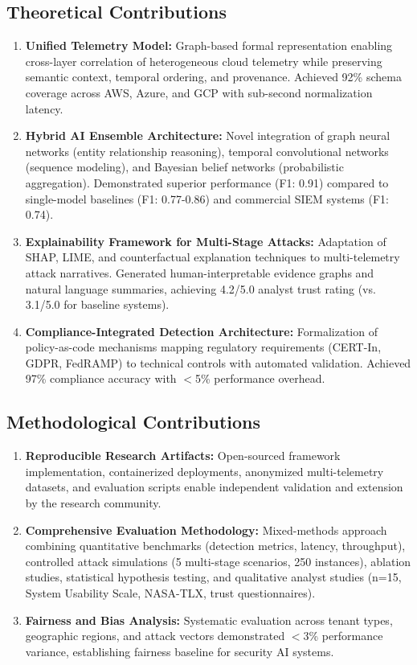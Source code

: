 \subsection{Theoretical Contributions}
\begin{enumerate}
    \item \textbf{Unified Telemetry Model:} Graph-based formal representation enabling cross-layer correlation of heterogeneous cloud telemetry while preserving semantic context, temporal ordering, and provenance. Achieved 92\% schema coverage across AWS, Azure, and GCP with sub-second normalization latency.
    
    \item \textbf{Hybrid AI Ensemble Architecture:} Novel integration of graph neural networks (entity relationship reasoning), temporal convolutional networks (sequence modeling), and Bayesian belief networks (probabilistic aggregation). Demonstrated superior performance (F1: 0.91) compared to single-model baselines (F1: 0.77-0.86) and commercial SIEM systems (F1: 0.74).
    
    \item \textbf{Explainability Framework for Multi-Stage Attacks:} Adaptation of SHAP, LIME, and counterfactual explanation techniques to multi-telemetry attack narratives. Generated human-interpretable evidence graphs and natural language summaries, achieving 4.2/5.0 analyst trust rating (vs. 3.1/5.0 for baseline systems).
    
    \item \textbf{Compliance-Integrated Detection Architecture:} Formalization of policy-as-code mechanisms mapping regulatory requirements (CERT-In, GDPR, FedRAMP) to technical controls with automated validation. Achieved 97\% compliance accuracy with $<$5\% performance overhead.
\end{enumerate}

\subsection{Methodological Contributions}
\begin{enumerate}
    \item \textbf{Reproducible Research Artifacts:} Open-sourced framework implementation, containerized deployments, anonymized multi-telemetry datasets, and evaluation scripts enable independent validation and extension by the research community.
    
    \item \textbf{Comprehensive Evaluation Methodology:} Mixed-methods approach combining quantitative benchmarks (detection metrics, latency, throughput), controlled attack simulations (5 multi-stage scenarios, 250 instances), ablation studies, statistical hypothesis testing, and qualitative analyst studies (n=15, System Usability Scale, NASA-TLX, trust questionnaires).
    
    \item \textbf{Fairness and Bias Analysis:} Systematic evaluation across tenant types, geographic regions, and attack vectors demonstrated $<$3\% performance variance, establishing fairness baseline for security AI systems.
\end{enumerate}

